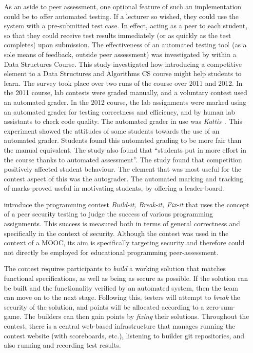\documentclass[sigplan,10pt,review]{acmart}\settopmatter{printfolios=true}
\begin{document}
As an aside to peer assessment, one optional feature of such an
implementation could be to offer automated testing. If a lecturer so
wished, they could use the system with a pre-submitted test case. In
effect, acting as a peer to each student, so that they could receive
test results immediately (or as quickly as the test completes) upon
submission.
%
The effectiveness of an automated testing tool (as a sole means of
feedback, outside peer assessment) was investigated by
\citet{farnqvist_competition_2016} within a Data Structures
Course.
%
This study investigated how introducing a competitive element to a
Data Structures and Algorithms \ac{CS} course might help students to
learn. The survey took place over two runs of the course over 2011 and
2012. In the 2011 course, lab contests were graded manually, and a
voluntary contest used an automated grader. In the 2012 course, the
lab assignments were marked using an automated grader for testing
correctness and efficiency, and by human lab assistants to check code
quality. The automated grader in use was
\textit{Kattis}~\cite{enstrom_five_2011}.
% 
This experiment showed the attitudes of some students towards the use
of an automated grader. Students found this automated grading to be
more fair than the manual equivalent. The study also found that
``students put in more effort in the course thanks to automated
assessment''.  The study found that competition positively affected
student behaviour. The element that was most useful for the contest
aspect of this was the autograder. The automated marking and tracking
of marks proved useful in motivating students, by offering a
leader-board.

\citet{Rue+Hic+Par+Lev+Mem+Pla+Mar_CCS-2016} introduce the programming
contest \emph{Build-it, Break-it, Fix-it} that uses the concept of a
peer security testing to judge the success of various programming
assignments. This success is measured both in terms of general
correctness and specifically in the context of security. Although the
contest was used in the context of a \ac{MOOC}, its aim is
specifically targeting security and therefore could not directly be
employed for educational programming peer-assessment.

The contest requires participants to \textit{build} a working solution
that matches functional specifications, as well as being as secure as
possible. If the solution can be built and the functionality verified
by an automated system, then the team can move on to the next
stage. Following this, testers will attempt to \textit{break} the
security of the solution, and points will be allocated according to a
zero-sum-game. The builders can then gain points by \textit{fixing}
their solutions.
Throughout the contest, there is a central web-based infrastructure
that manages running the contest website (with scoreboards, etc.),
listening to builder git repositories, and also running and recording
test results.
\end{document}
